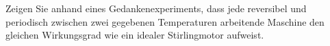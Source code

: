 Zeigen Sie anhand eines Gedankenexperiments, dass jede reversibel und periodisch zwischen zwei gegebenen Temperaturen arbeitende Maschine den gleichen Wirkungsgrad wie ein idealer Stirlingmotor aufweist.
